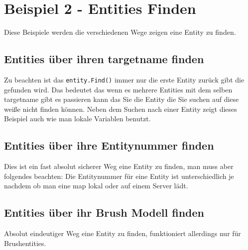 \documentclass[11pt,a4paper]{book}
\begin{document}
\section{Beispiel 2 - Entities Finden}
\label{example2}
Diese Beispiele werden die verschiedenen Wege zeigen eine Entity zu finden.
\subsection{Entities über ihren targetname finden}
\label{example21}

Zu beachten ist das \lstinline|entity.Find()| immer nur die erste Entity zurück gibt die gefunden wird. Das bedeutet das wenn es mehrere Entities mit dem selben targetname gibt es passieren kann das Sie die Entity die Sie suchen auf diese weiße nicht finden können.
\newline
Neben dem Suchen nach einer Entity zeigt dieses Beispiel auch wie man lokale Variablen benutzt.
\subsection{Entities über ihre Entitynummer finden}
\label{example22}

Dies ist ein fast absolut sicherer Weg eine Entity zu finden, man muss aber folgendes beachten: Die Entitynummer für eine Entity ist unterschiedlich je nachdem ob man eine map lokal oder auf einem Server lädt.
\subsection{Entities über ihr Brush Modell finden}
\label{example23}

Absolut eindeutiger Weg eine Entity zu finden, funktioniert allerdings nur für Brushentities.
\end{document}
